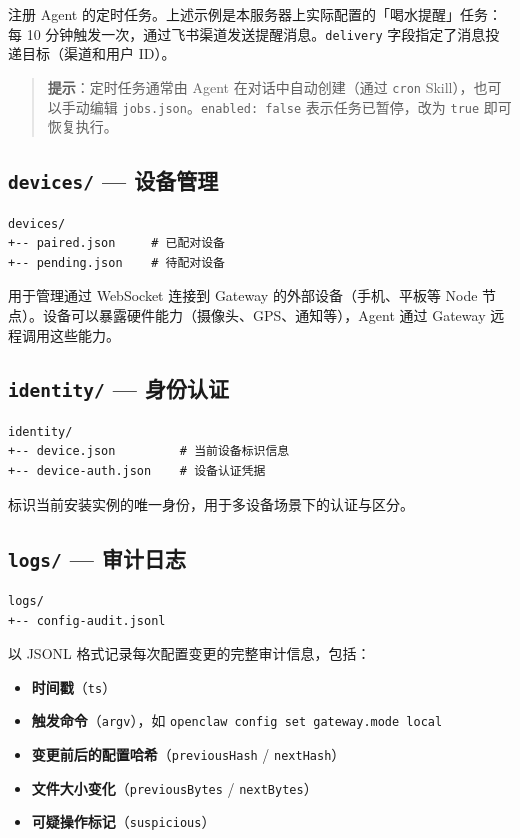 注册 Agent 的定时任务。上述示例是本服务器上实际配置的「喝水提醒」任务：每 10 分钟触发一次，通过飞书渠道发送提醒消息。\texttt{delivery} 字段指定了消息投递目标（渠道和用户 ID）。

\begin{quote}
\textbf{提示}：定时任务通常由 Agent 在对话中自动创建（通过 \texttt{cron} Skill），也可以手动编辑 \texttt{jobs.json}。\texttt{enabled: false} 表示任务已暂停，改为 \texttt{true} 即可恢复执行。
\end{quote}

\subsection{\texttt{devices/} --- 设备管理}


\begin{lstlisting}
devices/
+-- paired.json     # 已配对设备
+-- pending.json    # 待配对设备
\end{lstlisting}

用于管理通过 WebSocket 连接到 Gateway 的外部设备（手机、平板等 Node 节点）。设备可以暴露硬件能力（摄像头、GPS、通知等），Agent 通过 Gateway 远程调用这些能力。

\subsection{\texttt{identity/} --- 身份认证}


\begin{lstlisting}
identity/
+-- device.json         # 当前设备标识信息
+-- device-auth.json    # 设备认证凭据
\end{lstlisting}

标识当前安装实例的唯一身份，用于多设备场景下的认证与区分。

\subsection{\texttt{logs/} --- 审计日志}


\begin{lstlisting}
logs/
+-- config-audit.jsonl
\end{lstlisting}

以 JSONL 格式记录每次配置变更的完整审计信息，包括：

\begin{itemize}
  \item \textbf{时间戳}（\texttt{ts}）
  \item \textbf{触发命令}（\texttt{argv}），如 \texttt{openclaw config set gateway.mode local}
  \item \textbf{变更前后的配置哈希}（\texttt{previousHash} / \texttt{nextHash}）
  \item \textbf{文件大小变化}（\texttt{previousBytes} / \texttt{nextBytes}）
  \item \textbf{可疑操作标记}（\texttt{suspicious}）
\end{itemize}

